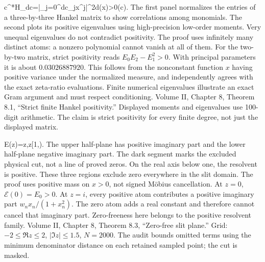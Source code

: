 {c^*H_dc=\int\left|\sum_{j=0}^{d}c_jx^j\right|^2d\nu(x)>0\qquad(c).}
{The first panel normalizes the entries of a three-by-three Hankel matrix to show correlations among monomials. The second plots its positive eigenvalues using high-precision low-order moments. Very unequal eigenvalues do not contradict positivity. The proof uses infinitely many distinct atoms: a nonzero polynomial cannot vanish at all of them.}
{For the two-by-two matrix, strict positivity reads $E_0E_2-E_1^2>0$. With principal parameters it is about $0.03026887920$. This follows from the nonconstant function $x$ having positive variance under the normalized measure, and independently agrees with the exact zeta-ratio evaluations.}
{Finite numerical eigenvalues illustrate an exact Gram argument and must respect conditioning.}
{Volume II, Chapter 8, Theorem 8.1, ``Strict finite Hankel positivity.'' Displayed moments and eigenvalues use 100-digit arithmetic. The claim is strict positivity for every finite degree, not just the displayed matrix.}

{\mathcal E(z)=z\int{},\qquad z\notin[1,\infty).}
{The upper half-plane has positive imaginary part and the lower half-plane negative imaginary part. The dark segment marks the excluded physical cut, not a line of proved zeros. On the real axis below one, the resolvent is positive. These three regions exclude zero everywhere in the slit domain. The proof uses positive mass on $x>0$, not signed Möbius cancellation.}
{At $z=0$, $\mathcal E(0)=E_0>0$. At $z=i$, every positive atom contributes a positive imaginary part $w_nx_n/(1+x_n^2)$. The zero atom adds a real constant and therefore cannot cancel that imaginary part.}
{Zero-freeness here belongs to the positive resolvent family.}
{Volume II, Chapter 8, Theorem 8.3, ``Zero-free slit plane.'' Grid: $-2\le\Re z\le2$, $|\Im z|\le1.5$, $N=2000$. The audit bounds omitted terms using the minimum denominator distance on each retained sampled point; the cut is masked.}


